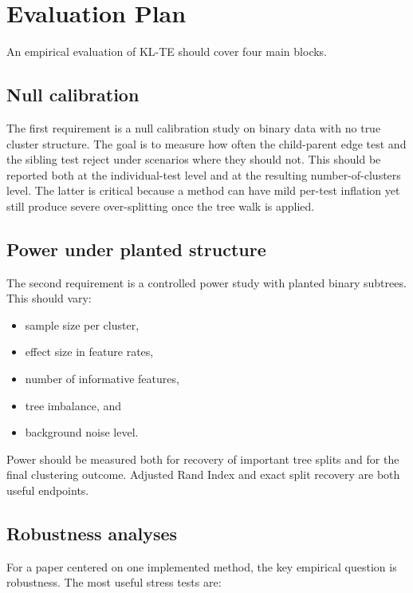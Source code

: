 
\section{Evaluation Plan}

An empirical evaluation of KL-TE should cover four main blocks.

\subsection{Null calibration}

The first requirement is a null calibration study on binary data with no true
cluster structure. The goal is to measure how often the child-parent edge test
and the sibling test reject under scenarios where they should not. This should
be reported both at the
individual-test level and at the resulting number-of-clusters level. The latter
is critical because a method can have mild per-test inflation yet still produce
severe over-splitting once the tree walk is applied.

\subsection{Power under planted structure}

The second requirement is a controlled power study with planted binary subtrees.
This should vary:

\begin{itemize}[leftmargin=1.5em]
  \item sample size per cluster,
  \item effect size in feature rates,
  \item number of informative features,
  \item tree imbalance, and
  \item background noise level.
\end{itemize}

Power should be measured both for recovery of important tree splits and for the
final clustering outcome. Adjusted Rand Index and exact split recovery are both
useful endpoints.

\subsection{Robustness analyses}

For a paper centered on one implemented method, the key empirical question is
robustness. The most useful stress tests are:


